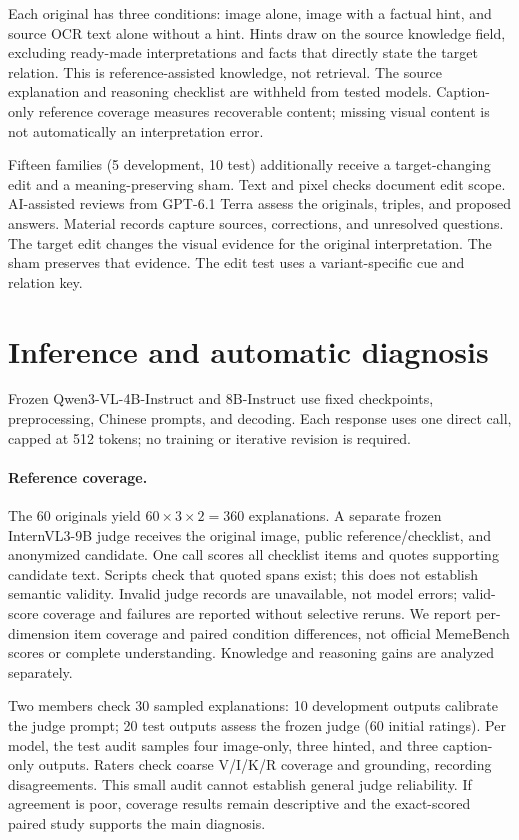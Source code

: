 \documentclass[11pt]{article}
\begin{document}
Each original has three conditions: image alone, image with a factual hint, and source OCR text alone without a hint. Hints draw on the source knowledge field, excluding ready-made interpretations and facts that directly state the target relation. This is reference-assisted knowledge, not retrieval. The source explanation and reasoning checklist are withheld from tested models. Caption-only reference coverage measures recoverable content; missing visual content is not automatically an interpretation error.

Fifteen families (5 development, 10 test) additionally receive a target-changing edit and a meaning-preserving sham. Text and pixel checks document edit scope. AI-assisted reviews from GPT-6.1 Terra assess the originals, triples, and proposed answers. Material records capture sources, corrections, and unresolved questions. The target edit changes the visual evidence for the original interpretation. The sham preserves that evidence. The edit test uses a variant-specific cue and relation key.

\section{Inference and automatic diagnosis}
Frozen Qwen3-VL-4B-Instruct and 8B-Instruct \citep{bai2025qwen3vl} use fixed checkpoints, preprocessing, Chinese prompts, and decoding. Each response uses one direct call, capped at 512 tokens; no training or iterative revision is required.

\paragraph{Reference coverage.}
The 60 originals yield $60\times3\times2=360$ explanations. A separate frozen InternVL3-9B judge \citep{opengvlab2025internvl3} receives the original image, public reference/checklist, and anonymized candidate. One call scores all checklist items and quotes supporting candidate text. Scripts check that quoted spans exist; this does not establish semantic validity. Invalid judge records are unavailable, not model errors; valid-score coverage and failures are reported without selective reruns. We report per-dimension item coverage and paired condition differences, not official MemeBench scores or complete understanding. Knowledge and reasoning gains are analyzed separately.

Two members check 30 sampled explanations: 10 development outputs calibrate the judge prompt; 20 test outputs assess the frozen judge (60 initial ratings). Per model, the test audit samples four image-only, three hinted, and three caption-only outputs. Raters check coarse V/I/K/R coverage and grounding, recording disagreements. This small audit cannot establish general judge reliability. If agreement is poor, coverage results remain descriptive and the exact-scored paired study supports the main diagnosis.
\end{document}
